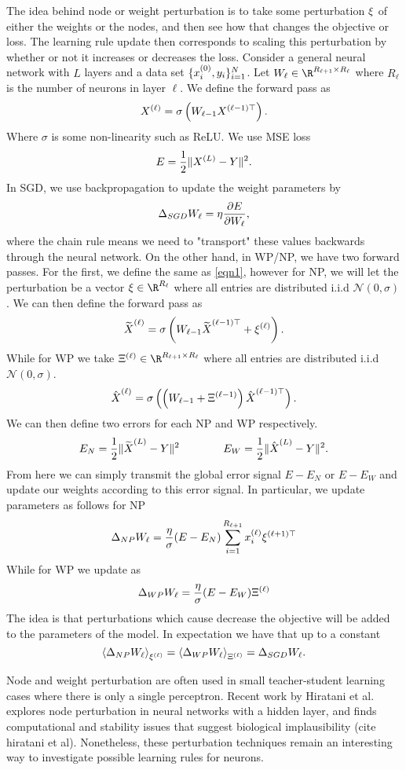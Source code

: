 \documentclass[11pt,letterpaper]{article}
\begin{document}
The idea behind node or weight perturbation is to take some perturbation $\*\xi$ of either
the weights or the nodes, and then see how that changes the objective or loss. The learning rule update
then corresponds to scaling this perturbation by whether or not it increases or decreases
the loss. Consider a general neural network with $L$ layers and a data set $\{\*x_i^{(0)},\*y_i\}_{i=1}^N$. 
Let $\*W_{\ell} \in \R^{R_{\ell+1} \times R_{\ell}}$ where $R_\ell$ is the number of 
neurons in layer $\ell$. We define the forward pass as
\begin{equation}\label{eqn1}\*X^{(\ell)} = \sigma\left(\*W_{\ell-1} \*X^{(\ell-1)\top}\right).\end{equation}
Where $\sigma$ is some non-linearity such as ReLU. We use MSE loss 
\[E = \frac 12 \| \*X^{(L)}- \*Y\|^2.\]
In SGD, we use backpropagation to update the weight parameters by 
\[\Delta_{SGD} \* W_{\ell} = \eta\frac{\partial E}{\partial \*W_{\ell}},\] 
where the chain rule means we 
need to "transport" these values backwards through the neural network. On the other 
hand, in WP/NP, we have two forward passes. For the first, we define the same as \ref{eqn1}, 
however for NP, we will let the perturbation be a vector $\xi \in \R^{R_{\ell}}$ where all entries are distributed 
i.i.d $\mathcal{N}(0,\sigma)$. We can then define the forward pass as 
\[ \widetilde{\*X}^{(\ell)} = \sigma\left(\*W_{\ell -1} \widetilde{\*X}^{(\ell-1)\top} + \*\xi^{(\ell)} \right).\]
While for WP we take $\*\Xi^{(\ell)} \in \R^{R_{\ell + 1 }\times R_\ell}$ where all entries are distributed 
i.i.d $\mathcal{N}(0,\sigma)$. 
\[ \hat{\*X}^{(\ell)} = \sigma\left(\left(\*W_{\ell -1} + \*\Xi^{(\ell-1)}\right) \hat{\*X}^{(\ell-1)\top}  \right).\]
We can then define two errors for each NP and WP respectively.
\[ E_N = \frac 12 \| \widetilde{\* X}^{(L)} - \* Y \|^2 \qquad\qquad E_W = \frac 12 \| \hat{\* X}^{(L)} - \* Y \|^2. \]
From here we can simply transmit the global error signal $E-E_N$ or $E-E_W$ and update our weights according
to this error signal. In particular, we update parameters as follows for NP
\[ \Delta_{NP} \*W_{\ell} =\frac{\eta}{\sigma} (E-E_N) \sum_{i=1}^{R_{\ell+1}} \*x^{(\ell)}_i \* \xi^{(\ell+1)\top} \]
While for WP we update as
\[ \Delta_{WP} \*W_{\ell} = \frac{\eta}{\sigma} (E-E_W) \* \Xi^{(\ell)} \]
 The idea is that perturbations which cause decrease the objective will be added to 
 the parameters of the model. In expectation we have that up to a constant
\[ \left\langle \Delta_{NP}\*W_{\ell} \right\rangle_{\*\xi^{(\ell)}}= \left\langle \Delta_{WP}\*W_{\ell} \right\rangle_{\*\Xi^{(\ell)}} =  \Delta_{SGD}\*W_{\ell}.\]

 
 
Node and weight perturbation are often used in small teacher-student learning cases 
where there is only a single perceptron. Recent work by Hiratani et al. explores node perturbation
in neural networks with a hidden layer, and finds computational and stability issues that
suggest biological implausibility (cite hiratani et al). Nonetheless, these perturbation techniques remain an interesting way
to investigate possible learning rules for neurons. 
\end{document}
